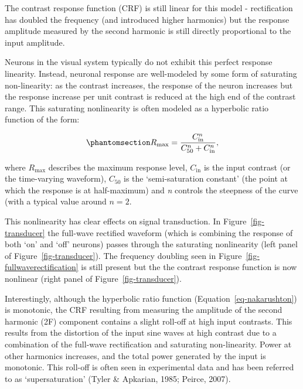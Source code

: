 \documentclass[
  letterpaper,
  DIV=11,
  numbers=noendperiod]{scrartcl}
\begin{document}
The contrast response function (CRF) is still linear for this model -
rectification has doubled the frequency (and introduced higher
harmonics) but the response amplitude measured by the second harmonic is
still directly proportional to the input amplitude.

Neurons in the visual system typically do not exhibit this perfect
response linearity. Instead, neuronal response are well-modeled by some
form of saturating non-linearity: as the contrast increases, the
response of the neuron increases but the response increase per unit
contrast is reduced at the high end of the contrast range. This
saturating nonlinearity is often modeled as a hyperbolic ratio function
of the form:

\begin{equation}\phantomsection\label{eq-nakarushton}{R_{\mathrm{max}} = \frac{C_{\mathrm{in}}^n}{C_{50}^n + C_{\mathrm{in}}^n},}\end{equation}

where \({R_{\mathrm{max}}}\) describes the maximum response level,
\(C_{\mathrm{in}}\) is the input contrast (or the time-varying
waveform), \(C_{50}\) is the `semi-saturation constant' (the point at
which the response is at half-maximum) and \emph{n} controls the
steepness of the curve (with a typical value around \(n=2\).

This nonlinearity has clear effects on signal transduction. In
Figure~\ref{fig-transducer} the full-wave rectified waveform (which is
combining the response of both `on' and `off' neurons) passes through
the saturating nonlinearity (left panel of Figure~\ref{fig-transducer}).
The frequency doubling seen in Figure~\ref{fig-fullwaverectification} is
still present but the the contrast response function is now nonlinear
(right panel of Figure~\ref{fig-transducer}).

Interestingly, although the hyperbolic ratio function
(Equation~\ref{eq-nakarushton}) is monotonic, the CRF resulting from
measuring the amplitude of the second harmonic (2F) component contains a
slight roll-off at high input contrasts. This results from the
distortion of the input sine waves at high contrast due to a combination
of the full-wave rectification and saturating non-linearity. Power at
other harmonics increases, and the total power generated by the input is
monotonic. This roll-off is often seen in experimental data and has been
referred to as `supersaturation' (Tyler \& Apkarian, 1985; Peirce,
2007).
\end{document}
